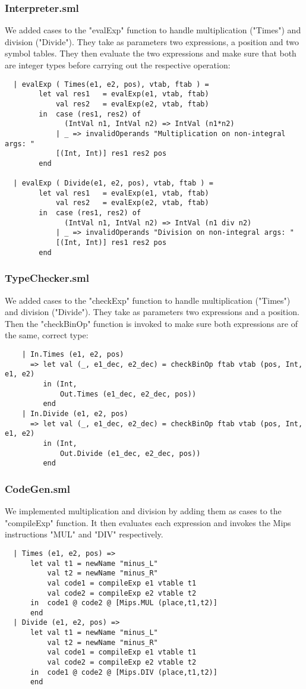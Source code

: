 \documentclass[12pt]{article}
\begin{document}
\subsubsection{Interpreter.sml}
We added cases to the "evalExp" function to handle multiplication ("Times") and division ("Divide"). They take as parameters two expressions, a position and two symbol tables. They then evaluate the two expressions and make sure that both are integer types before carrying out the respective operation: 
\begin{verbatim}
  | evalExp ( Times(e1, e2, pos), vtab, ftab ) =
        let val res1   = evalExp(e1, vtab, ftab)
            val res2   = evalExp(e2, vtab, ftab)
        in  case (res1, res2) of
              (IntVal n1, IntVal n2) => IntVal (n1*n2)
            | _ => invalidOperands "Multiplication on non-integral args: " 
            [(Int, Int)] res1 res2 pos
        end

  | evalExp ( Divide(e1, e2, pos), vtab, ftab ) = 
        let val res1   = evalExp(e1, vtab, ftab)
            val res2   = evalExp(e2, vtab, ftab)
        in  case (res1, res2) of
              (IntVal n1, IntVal n2) => IntVal (n1 div n2)
            | _ => invalidOperands "Division on non-integral args: " 
            [(Int, Int)] res1 res2 pos
        end
\end{verbatim}
\subsubsection{TypeChecker.sml}
We added cases to the "checkExp" function to handle multiplication ("Times") and division ("Divide"). They take as parameters two expressions and a position. Then the "checkBinOp" function is invoked to make sure both expressions are of the same, correct type:
\begin{verbatim}
    | In.Times (e1, e2, pos)
      => let val (_, e1_dec, e2_dec) = checkBinOp ftab vtab (pos, Int, e1, e2)
         in (Int,
             Out.Times (e1_dec, e2_dec, pos))
         end
    | In.Divide (e1, e2, pos)
      => let val (_, e1_dec, e2_dec) = checkBinOp ftab vtab (pos, Int, e1, e2)
         in (Int,
             Out.Divide (e1_dec, e2_dec, pos))
         end
\end{verbatim}
\subsubsection{CodeGen.sml}
We implemented multiplication and division by adding them as cases to the "compileExp" function. It then evaluates each expression and invokes the Mips instructions "MUL" and "DIV" respectively. 
\begin{verbatim}
  | Times (e1, e2, pos) =>
      let val t1 = newName "minus_L"
          val t2 = newName "minus_R"
          val code1 = compileExp e1 vtable t1
          val code2 = compileExp e2 vtable t2
      in  code1 @ code2 @ [Mips.MUL (place,t1,t2)]
      end
  | Divide (e1, e2, pos) =>
      let val t1 = newName "minus_L"
          val t2 = newName "minus_R"
          val code1 = compileExp e1 vtable t1
          val code2 = compileExp e2 vtable t2
      in  code1 @ code2 @ [Mips.DIV (place,t1,t2)]
      end
\end{verbatim}
\end{document}
